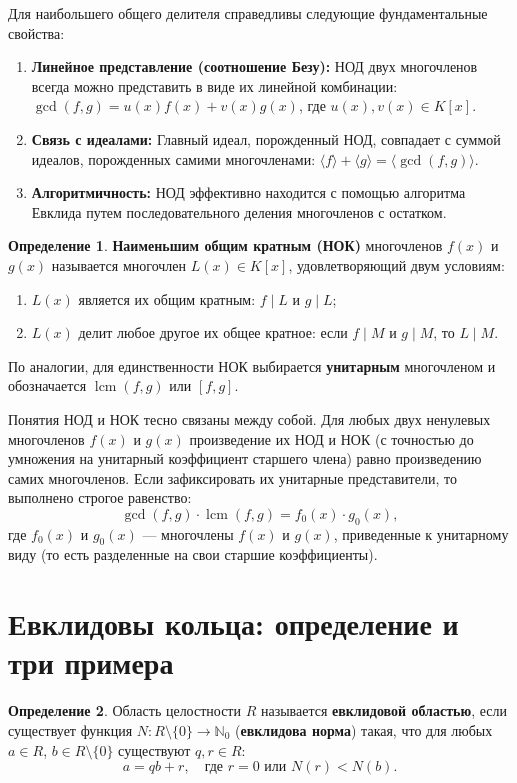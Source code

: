 \documentclass[12pt, a4paper]{article}
\theoremstyle{definition}
\newtheorem{definition}{Определение}
\theoremstyle{remark}
\begin{document}
Для наибольшего общего делителя справедливы следующие фундаментальные свойства:
\begin{enumerate}
	\item \textbf{Линейное представление (соотношение Безу):} НОД двух многочленов всегда можно представить в виде их линейной комбинации: $\gcd(f, g) = u(x)f(x) + v(x)g(x)$, где $u(x), v(x) \in K[x]$.
	\item \textbf{Связь с идеалами:} Главный идеал, порожденный НОД, совпадает с суммой идеалов, порожденных самими многочленами: $\langle f \rangle + \langle g \rangle = \langle \gcd(f, g) \rangle$.
	\item \textbf{Алгоритмичность:} НОД эффективно находится с помощью алгоритма Евклида путем последовательного деления многочленов с остатком.
\end{enumerate}

\begin{definition}
	\textbf{Наименьшим общим кратным (НОК)} многочленов $f(x)$ и $g(x)$ называется многочлен $L(x) \in K[x]$, удовлетворяющий двум условиям:
	\begin{enumerate}
		\item $L(x)$ является их общим кратным: $f \mid L$ и $g \mid L$;
		\item $L(x)$ делит любое другое их общее кратное: если $f \mid M$ и $g \mid M$, то $L \mid M$.
	\end{enumerate}
	По аналогии, для единственности НОК выбирается \textbf{унитарным} многочленом и обозначается $\operatorname{lcm}(f, g)$ или $[f, g]$.
\end{definition}

Понятия НОД и НОК тесно связаны между собой. Для любых двух ненулевых многочленов $f(x)$ и $g(x)$ произведение их НОД и НОК (с точностью до умножения на унитарный коэффициент старшего члена) равно произведению самих многочленов. Если зафиксировать их унитарные представители, то выполнено строгое равенство:
\[
\gcd(f, g) \cdot \operatorname{lcm}(f, g) = f_0(x) \cdot g_0(x),
\]
где $f_0(x)$ и $g_0(x)$ — многочлены $f(x)$ и $g(x)$, приведенные к унитарному виду (то есть разделенные на свои старшие коэффициенты).

\section{Евклидовы кольца: определение и три примера}

\begin{definition}
	Область целостности $R$ называется \textbf{евклидовой областью}, если существует функция $N \colon R \setminus \{0\} \to \mathbb{N}_0$ (\textbf{евклидова норма}) такая, что для любых $a \in R$, $b \in R \setminus \{0\}$ существуют $q, r \in R$:
	\[
	a = qb + r, \quad \text{где } r = 0 \text{ или } N(r) < N(b).
	\]
\end{definition}
\end{document}
